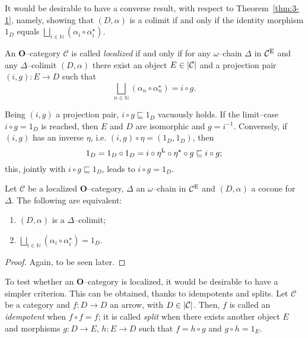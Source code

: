 It would be desirable to have a converse result, with respect to Theorem~\ref{thm:3-1}, namely, showing that \((D,\alpha)\) is a colimit if and only if the identity morphism \(1_D\) equals \(\bigsqcup_{i \in \mathbb{N}}(\alpha_i \circ \alpha_i^\star)\).

\begin{dfn}\label{dfn:localized}
  An \(\mathbf{O}\)--category \(\mathcal{C}\) is called \emph{localized} if and only if for any \(\omega{}\)--chain \(\Delta{}\) in \(\mathcal{C}^\textup{E}\) and any \(\Delta{}\)--colimit \((D,\alpha)\) there exist an object \(E \in \lvert \mathcal{C} \rvert\) and a projection pair \((i,g) \colon E \to D\) such that
  \begin{equation*}
    \bigsqcup_{n \in \mathbb{N}}(\alpha_n \circ \alpha_n^\star) = i \circ g.
  \end{equation*}
\end{dfn}

Being \((i,g)\) a projection pair, \(i \circ g \sqsubseteq 1_D\) vacuously holds. If the limit--case \(i \circ g = 1_D\) is reached, then \(E\) and \(D\) are isomorphic and \(g = i^{-1}\). %
Conversely, if \((i,g)\) has an inverse \(\eta{}\), i.e. \((i,g) \circ \eta = (1_D,1_D)\), then
\begin{equation*}
    1_D = 1_D \circ 1_D = i \circ \eta^\textup{L} \circ \eta^\star \circ g
    \sqsubseteq i \circ g;
\end{equation*}
this, jointly with \(i \circ g \sqsubseteq 1_D\), leads to \(i \circ g = 1_D\).

\begin{thm}\label{thm:3-2}
  Let \(\mathcal{C}\) be a localized \(\mathbf{O}\)--category, \(\Delta{}\) an \(\omega{}\)--chain in \(\mathcal{C}^\textup{E}\) and \((D,\alpha)\) a cocone for \(\Delta{}\). The following are equivalent:
  \begin{enumerate}
    \item \((D,\alpha)\) is a \(\Delta{}\)--colimit;
    \item \(\bigsqcup_{i \in \mathbb{N}}(\alpha_i \circ \alpha_i^\star) = 1_D\).
  \end{enumerate}
\end{thm}
\begin{proof}
  Again, to be seen later.
\end{proof}

To test whether an \(\mathbf{O}\)--category is localized, it would be desirable to have a simpler criterion. This can be obtained, thanks to idempotents and splits. Let \(\mathcal{C}\) be a category and \(f \colon D \to D\) an arrow, with \(D \in \lvert \mathcal{C} \rvert\). Then, \(f\) is called an \emph{idempotent} when \(f \circ f = f\); it is called \emph{split} when there exists another object \(E\) and morphisms \(g \colon D \to E\), \(h \colon E \to D\) such that \(f = h \circ g\) and \(g \circ h = 1_E\).
\begin{center}
\end{center}

